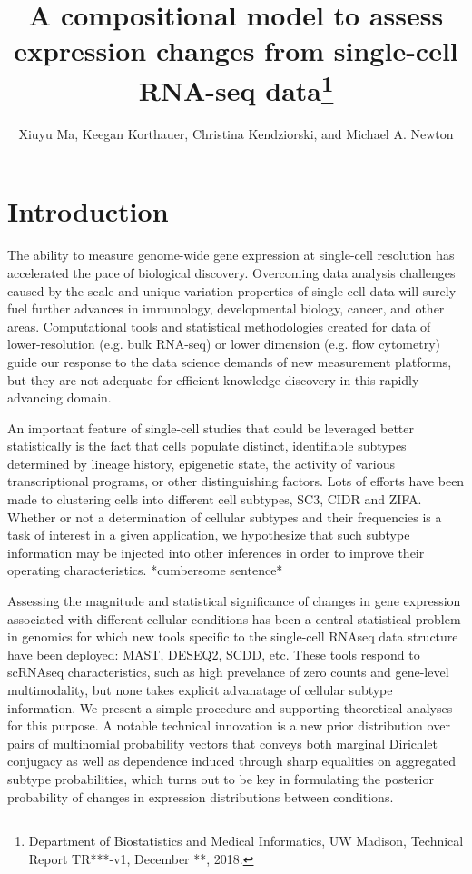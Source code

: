 \documentclass[11pt]{amsart}
\title{A compositional model to assess expression changes from
 single-cell RNA-seq data\footnote{Department of Biostatistics and Medical Informatics, UW Madison, Technical Report TR***-v1, December **, 2018.}}
\author{Xiuyu Ma,  Keegan Korthauer, Christina Kendziorski, and Michael A. Newton}
\begin{document}
\maketitle
\section{Introduction}

The ability to measure genome-wide gene expression at single-cell resolution 
has accelerated the pace of biological discovery\cite{scs}.  Overcoming data
analysis challenges caused by the scale and unique variation properties of single-cell
data will surely fuel further advances in immunology\cite{immune}, developmental
biology\cite{dv}, cancer\cite{cancer}, and other areas. 
 Computational tools and statistical methodologies 
created for data of lower-resolution (e.g. bulk RNA-seq) or lower dimension 
(e.g. flow cytometry)  guide our response to 
 the data science demands of new measurement platforms,
but they are not adequate for efficient knowledge discovery in this
rapidly advancing domain\cite{Bacher:2016aa}.

An important feature of single-cell studies that could be leveraged better
statistically is the fact that cells populate distinct, identifiable subtypes
determined by lineage history, epigenetic state, the activity
of various transcriptional programs, or other 
distinguishing factors. Lots of efforts have been made to clustering cells
into different cell subtypes, SC3\cite{sc3}, CIDR\cite{CIDR} and ZIFA\cite{ZIFA}.
Whether or not a determination of cellular subtypes and their frequencies 
is a task of interest in a given application, we hypothesize that such
subtype information may be injected into other inferences in order
to improve their operating characteristics. *cumbersome sentence*

Assessing the magnitude and statistical significance of changes in gene
expression associated with different cellular conditions has been a central
statistical problem in genomics for which new tools specific to
the single-cell RNAseq data structure have been deployed: MAST\cite{ref:MAST},
DESEQ2\cite{ref:Des}, SCDD\cite{ref:scDD}, etc.  These tools respond
to scRNAseq characteristics, such as high prevelance of zero counts and
gene-level multimodality, but none takes explicit advanatage of cellular subtype
information.  We present a simple procedure and supporting theoretical
analyses for this purpose.  A notable technical innovation is a new prior
distribution over pairs of multinomial probability vectors that conveys
both marginal Dirichlet conjugacy as well as
 dependence induced through sharp equalities on aggregated 
 subtype probabilities, which turns out to be key in formulating 
 the posterior probability of changes in expression distributions between conditions.
 
\end{document}

